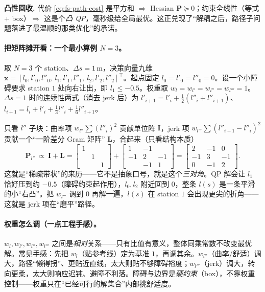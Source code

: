 \begin{note}
\textbf{凸性回收.}\;
代价 \cref{eq:fs-path-cost} 是平方和 $\Rightarrow$ Hessian $\mathbf{P}\succeq0$；约束全线性（等式 + box）$\Rightarrow$ 这是个\emph{凸 QP}，毫秒级给全局最优。这正兑现了“解耦之后，路径子问题落进了最温顺的那类优化”的承诺。
\end{note}

\paragraph{把矩阵摊开看：一个最小算例 $N=3$。}
取 $N=3$ 个 station、$\Delta s=1\,\mathrm{m}$，决策向量九维 $\mathbf{x}=[l_0,l'_0,l''_0,\ l_1,l'_1,l''_1,\ l_2,l'_2,l''_2]^\top$。起点固定 $l_0=l'_0=l''_0=0$。设一个小障碍要求 station $1$ 处向右让出，即 $l_1\le-0.5$。权重取 $w_l=w_{l'}=w_{l''}=w_{l'''}=1$。$\Delta s=1$ 时的连续性两式（消去 jerk 后）为 $l'_{i+1}=l'_i+\tfrac12(l''_i+l''_{i+1})$、$l_{i+1}=l_i+l'_i+\tfrac13 l''_i+\tfrac16 l''_{i+1}$。

只看 $l''$ 子块：曲率项 $w_{l''}\sum(l''_i)^2$ 贡献单位阵 $\mathbf{I}$，jerk 项 $w_{l'''}\sum(l''_{i+1}-l''_i)^2$ 贡献一个“一阶差分 Gram 矩阵” $\mathbf{L}$，合起来（只看结构本质）
\begin{equation}
  \mathbf{P}_{l''}\ \propto\ \mathbf{I}+\mathbf{L}
  =\begin{bmatrix}1&&\\&1&\\&&1\end{bmatrix}
  +\begin{bmatrix}1&-1&\\-1&2&-1\\&-1&1\end{bmatrix}
  =\begin{bmatrix}2&-1&0\\-1&3&-1\\0&-1&2\end{bmatrix}.
  \label{eq:fs-tridiag}
\end{equation}
这就是“稀疏带状”的来历——它不是抽象口号，就是这个\emph{三对角}。QP 解会让 $l_1$ 恰好压到约 $-0.5$（障碍约束起作用），$l_0,l_2$ 附近回到 $0$，整条 $l(s)$ 是一条平滑的小“右凸”。把 $w_{l'''}$ 调到 $0$ 再解一遍，$l(s)$ 在 station $1$ 会出现更尖的折角——这就是 jerk 项在“磨平”路径。

\paragraph{权重怎么调（一点工程手感）。}
$w_l,w_{l'},w_{l''},w_{l'''}$ 之间是\emph{相对}关系——只有比值有意义，整体同乘常数不改变最优解。常见手感：先把 $w_l$（贴参考线）定为基准 $1$，再调其余。$w_{l''}$（曲率/舒适）调大，路径“懒得拐”、更贴近直线，太大则贴不够障碍裕度；$w_{l'''}$（jerk）调大，转向更柔，太大则响应迟钝、避障不利落。障碍与边界是\emph{硬约束}（box），不靠权重控制——权重只在“已经可行的解集合”内部挑舒适度。

